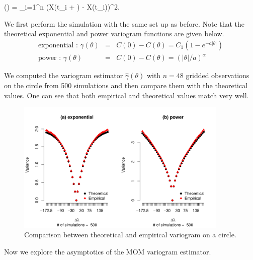 \beq
\hat{\gamma}(\Delta \lambda) =  \sum_{i=1}^n (X(t_i + \Delta \lambda) - X(t_i))^2.
\eeq

We first perform the simulation with the same set up as before. Note that the theoretical exponential and power variogram functions are given below.
\begin{eqnarray*}
	\mbox{exponential : }\gamma(\theta) &=& C(0) - C(\theta) = C_1(1-e^{-a|\theta|}) \\
	\mbox{power : } \gamma(\theta) &=& C(0) - C(\theta) = (|\theta|/a)^{\alpha}
\end{eqnarray*}

We computed the variogram estimator $\hat{\gamma}(\theta)$ with $n = 48$ gridded observations on the circle from 500 simulations and then compare them with the theoretical values. One can see that both empirical and theoretical values match very well.


\begin{figure}[H]
	\centering
	\includegraphics[width=0.9\textwidth]{graphs/variogram_plot_500}
	\caption {Comparison between theoretical and empirical variogram on a circle.}
\end{figure}




Now we explore the asymptotics of the MOM variogram estimator.

